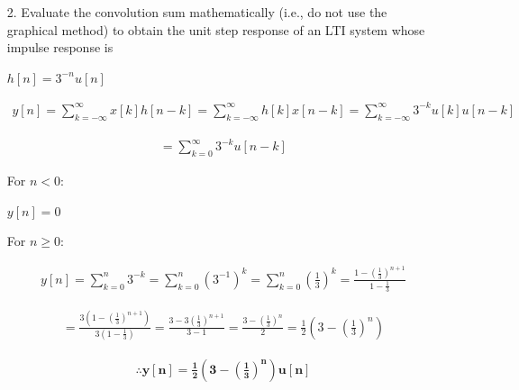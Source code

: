 \documentclass[fleqn]{article}
\begin{document}
\begin{enumerate}
		\item[2.] Evaluate the convolution sum mathematically (i.e., do not use the graphical method) to obtain the unit step response of an LTI system whose impulse response is
		
		$h[n] = 3^{-n}u[n]$
		
		\begin{align*}
			y[n] = \sum_{k = -\infty}^{\infty}{x[k]h[n-k]} = \sum_{k = -\infty}^{\infty}{h[k]x[n-k]} = \sum_{k = -\infty}^{\infty}{3^{-k}u[k]u[n-k]}
		\end{align*}
		
		\begin{align*}
			= \sum_{k = 0}^{\infty}{3^{-k}u[n-k]}
		\end{align*}
		
		For $n < 0$:
		
		$y[n] = 0$
		
		For $n \geq 0$:
		
		\begin{align*}
			y[n] = \sum_{k = 0}^{n}{3^{-k}} = \sum_{k = 0}^{n}{(3^{-1})^k} = \sum_{k = 0}^{n}{\left(\frac{1}{3}\right)^k} = \frac{1-\left(\frac{1}{3}\right)^{n+1}}{1-\frac{1}{3}}
		\end{align*}
		
		\begin{align*}
			 = \frac{3\left(1-\left(\frac{1}{3}\right)^{n+1}\right)}{3\left(1-\frac{1}{3}\right)} = \frac{3-3\left(\frac{1}{3}\right)^{n+1}}{3-1} = \frac{3-\left(\frac{1}{3}\right)^{n}}{2} = \frac{1}{2}\left(3-\left(\frac{1}{3}\right)^{n}\right)
		\end{align*}
		
		\begin{align*}
			\mathbf{\therefore y[n] = \frac{1}{2}\left(3-\left(\frac{1}{3}\right)^{n}\right)u[n]}
		\end{align*}
	\end{enumerate}
	
\end{document}
